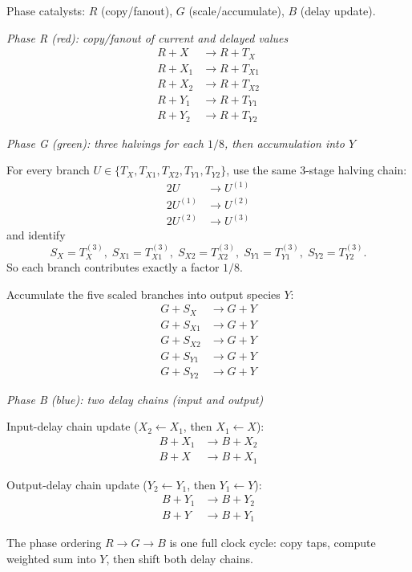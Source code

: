 \documentclass[12pt]{article}
\begin{document}
Phase catalysts: $R$ (copy/fanout), $G$ (scale/accumulate), $B$ (delay update).

\medskip
\noindent\textit{Phase R (red): copy/fanout of current and delayed values}
\begin{align*}
R + X &\to R + T_X \\
R + X_1 &\to R + T_{X1} \\
R + X_2 &\to R + T_{X2} \\
R + Y_1 &\to R + T_{Y1} \\
R + Y_2 &\to R + T_{Y2}
\end{align*}

\noindent\textit{Phase G (green): three halvings for each $1/8$, then accumulation into $Y$}

For every branch $U\in\{T_X,T_{X1},T_{X2},T_{Y1},T_{Y2}\}$, use the same 3-stage halving chain:
\begin{align*}
2U &\to U^{(1)} \\
2U^{(1)} &\to U^{(2)} \\
2U^{(2)} &\to U^{(3)}
\end{align*}
and identify
\[
S_X=T_X^{(3)},\;S_{X1}=T_{X1}^{(3)},\;S_{X2}=T_{X2}^{(3)},\;S_{Y1}=T_{Y1}^{(3)},\;S_{Y2}=T_{Y2}^{(3)}.
\]
So each branch contributes exactly a factor $1/8$.

Accumulate the five scaled branches into output species $Y$:
\begin{align*}
G + S_X &\to G + Y \\
G + S_{X1} &\to G + Y \\
G + S_{X2} &\to G + Y \\
G + S_{Y1} &\to G + Y \\
G + S_{Y2} &\to G + Y
\end{align*}

\noindent\textit{Phase B (blue): two delay chains (input and output)}

Input-delay chain update ($X_2\leftarrow X_1$, then $X_1\leftarrow X$):
\begin{align*}
B + X_1 &\to B + X_2 \\
B + X   &\to B + X_1
\end{align*}

Output-delay chain update ($Y_2\leftarrow Y_1$, then $Y_1\leftarrow Y$):
\begin{align*}
B + Y_1 &\to B + Y_2 \\
B + Y   &\to B + Y_1
\end{align*}

The phase ordering $R\rightarrow G\rightarrow B$ is one full clock cycle: copy taps, compute weighted sum into $Y$, then shift both delay chains.
\end{document}
